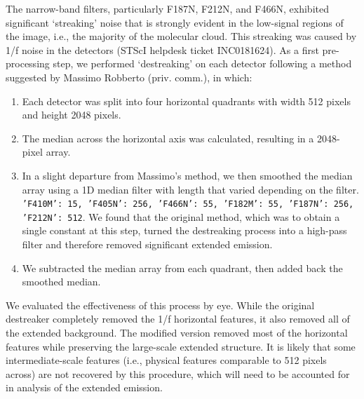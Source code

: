 \documentclass[times,astrosymb,twocolumn]{aastex631}
\def\rr#1{#1}
\begin{document}
The narrow-band filters, particularly F187N, F212N, and F466N, exhibited significant `streaking' noise that is strongly evident in the low-signal regions of the image, i.e., the majority of the molecular cloud.
This streaking \rr{was} caused by 1/f noise in the detectors (STScI helpdesk ticket INC0181624).
As a first pre-processing step, we performed `destreaking' on each detector following a method suggested by Massimo Robberto (priv. comm.), in which:
\begin{enumerate}
    \item Each detector \rr{was} split into four horizontal quadrants with width 512 pixels and height 2048 pixels.
    \item The median across the horizontal axis \rr{was} calculated, resulting in a 2048-pixel array.
    \item In a slight departure from Massimo's method, we then smooth\rr{ed} the median array using a 1D median filter with length that varie\rr{d} depending on the filter.
    \texttt{{'F410M': 15, 'F405N': 256, 'F466N': 55,  'F182M': 55, 'F187N': 256, 'F212N': 512}}.  We found that the original method, which was to obtain a single constant at this step, turned the destreaking process into a high-pass filter and therefore removed significant extended emission.
    \item We subtract\rr{ed} the median array from each quadrant, then add\rr{ed} back the smoothed median.
\end{enumerate}

We evaluated the effectiveness of this process by eye.
While the original destreaker completely removed the 1/f horizontal features, it also removed all of the extended background.
The modified version removed most of the horizontal features while preserving the large-scale extended structure.
It is likely that some intermediate-scale features (i.e., physical features comparable to 512 pixels across) are not recovered by this procedure, which will need to be accounted for in analysis of the extended emission.
\end{document}

